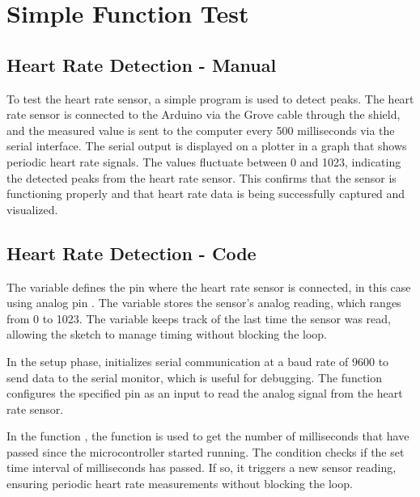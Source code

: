 \section{Simple Function Test}


\subsection{Heart Rate Detection - Manual}

To test the heart rate sensor, a simple program is used to detect peaks. The heart rate sensor is connected to the Arduino via the Grove cable through the shield, and the measured value is sent to the computer every 500 milliseconds via the serial interface. The serial output is displayed on a plotter in a graph that shows periodic heart rate signals. The values fluctuate between 0 and 1023, indicating the detected peaks from the heart rate sensor. This confirms that the sensor is functioning properly and that heart rate data is being successfully captured and visualized.

\subsection{Heart Rate Detection - Code}

The variable  defines the pin where the heart rate sensor is connected, in this case using analog pin .  The variable  stores the sensor's analog reading, which ranges from 0 to 1023. The  variable keeps track of the last time the sensor was read, allowing the sketch to manage timing without blocking the loop.

In the setup phase,  initializes serial communication at a baud rate of 9600 to send data to the serial monitor, which is useful for debugging. The function  configures the specified pin as an input to read the analog signal from the heart rate sensor.

In the function , the function  is used to get the number of milliseconds that have passed since the microcontroller started running. The condition  checks if the set time interval of  milliseconds has passed. If so, it triggers a new sensor reading, ensuring periodic heart rate measurements without blocking the loop.


